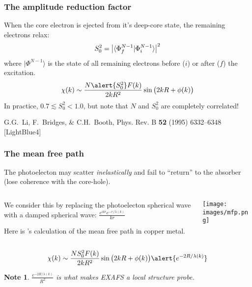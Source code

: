 \documentclass[10pt, xcolor=x11names, compress]{beamer}
\newtheorem{notethis}[theorem]{Note}
\begin{document}
\begin{frame}
  \frametitle{The amplitude reduction factor}

  When the core electron is ejected from it's deep-core state, the
  remaining electrons relax:
  \begin{equation}
    S_0^2 = \big|\langle \Phi_f^{N-1}  | \Phi_i^{N-1}  \rangle
    \big|^2    \notag
  \end{equation}
  where $|\Phi^{N-1}\rangle$ is the state of all remaining electrons
  before ($i$) or after ($f$) the excitation.
  \begin{equation}
    \chi(k) \sim \frac{N\alert{S_0^2}F(k)}{2kR^2}\sin\big(2kR+\phi(k)\big)
    \notag
  \end{equation}
  In practice, $0.7\lesssim S_0^2<1.0$, but note that $N$ and $S_0^2$
  are completely correlated!
  \begin{bottomnote}[0.6][19.25]
    G.G.\ Li, F.\ Bridges, \& C.H.\ Booth, Phys. Rev. B \textbf{52}
    (1995) 6332--6348
    [LightBlue4]
  \end{bottomnote}
\end{frame}

\begin{frame}
  \frametitle{The mean free path}
  The photoelecton may scatter \textit{inelastically} and fail to
  ``return'' to the absorber (lose coherence with the core-hole).

  \medskip

  \begin{columns}
    \begin{column}{0.5\linewidth}
      We consider this by replacing the photoelecton spherical wave
      with a damped spherical wave:
      $\frac{e^{ikr}e^{-r/\lambda(k)}}{kr}$

      \medskip

      Here is {\feff}'s calculation of the mean free path in copper
      metal.
    \end{column}
    \begin{column}{0.5\linewidth}
      \texttt{[image: images/mfp.png]}
    \end{column}
  \end{columns}
  \begin{equation}
    \chi(k) \sim \frac{NS_0^2F(k)}{2kR^2}\sin\big(2kR+\phi(k)\big)
    \alert{e^{-2R/\lambda(k)}}
    \notag
  \end{equation}
  \begin{notethis}
    $\frac{e^{-2R/\lambda(k)}}{R^2}$ is what makes EXAFS a \alert{local}
    structure probe.
  \end{notethis}
\end{frame}
\end{document}
